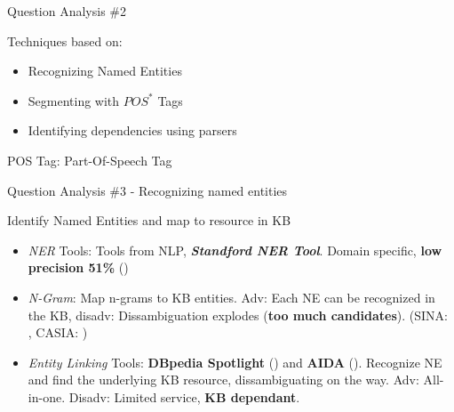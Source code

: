 \documentclass{beamer}
\begin{document}
\begin{frame}{Question Analysis \#2}
  \begin{card}
    Techniques based on:
    \begin{itemize}
      \item Recognizing Named Entities
      \item Segmenting with $POS^{*}$ Tags
      \item Identifying dependencies using parsers
    \end{itemize}
  \end{card}
  \vspace{8em}
  POS Tag: Part-Of-Speech Tag
\end{frame}


\begin{frame}{Question Analysis \#3 - Recognizing named entities}
  \begin{card}
    Identify Named Entities and map to resource in KB
    \begin{itemize}
      \item \textit{NER} Tools: Tools from NLP, \textbf{\textit{Standford NER Tool}}. Domain specific, \textbf{low precision 51\%} (\cite{he2014a})
      \item \textit{N-Gram}: Map n-grams to KB entities. Adv: Each NE can be recognized in the KB, disadv: Dissambiguation explodes (\textbf{too much candidates}). (SINA: \cite{shekarpour2015a}, CASIA: \cite{he2014a})
      \item \textit{Entity Linking} Tools: \textbf{DBpedia Spotlight} (\cite{daiber2013a}) and \textbf{AIDA} (\cite{yosef2011a}). Recognize NE and find the underlying KB resource, dissambiguating on the way. Adv: All-in-one. Disadv: Limited service, \textbf{KB dependant}.
    \end{itemize}
  \end{card}
\end{frame}
\end{document}
